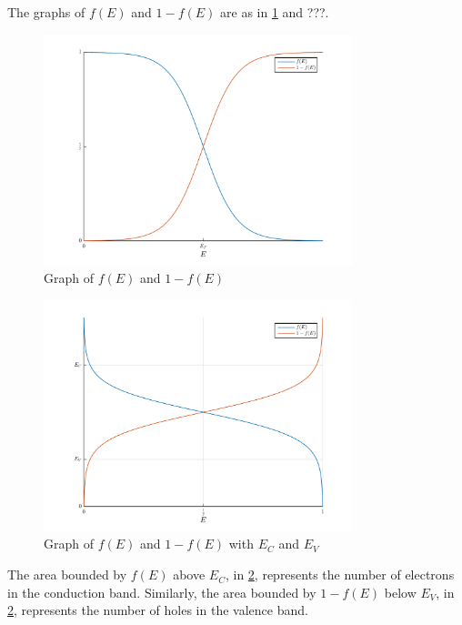 \documentclass[titlepage, fleqn, a4paper, 12pt, twoside]{article}
\theoremstyle{definition}
\theoremstyle{theorem}
\begin{document}
The graphs of $f(E)$ and $1 - f(E)$ are as in \cref{fig:Graph_of_$f(E)$_and_$1_-_f(E)$} and ???.
\begin{figure}[h]
	\centering
	\includegraphics[width = 0.8\textwidth]{./Plots/fermi_function_and_one_minus_fermi_function.pdf}
	\caption{Graph of $f(E)$ and $1 - f(E)$}
	\label{fig:Graph_of_$f(E)$_and_$1_-_f(E)$}
\end{figure}
\begin{figure}[h]
	\centering
	\includegraphics[width = 0.8\textwidth]{./Plots/fermi_function_vertical.pdf}
	\caption{Graph of $f(E)$ and $1 - f(E)$ with $E_C$ and $E_V$}
	\label{fig:Graph_of_$f(E)$_and_$1_-_f(E)$_with_$E_C$_and_$E_V$}
\end{figure}
The area bounded by $f(E)$ above $E_C$, in \cref{fig:Graph_of_$f(E)$_and_$1_-_f(E)$_with_$E_C$_and_$E_V$}, represents the number of electrons in the conduction band.
Similarly, the area bounded by $1 - f(E)$ below $E_V$, in \cref{fig:Graph_of_$f(E)$_and_$1_-_f(E)$_with_$E_C$_and_$E_V$}, represents the number of holes in the valence band.\\
\end{document}
